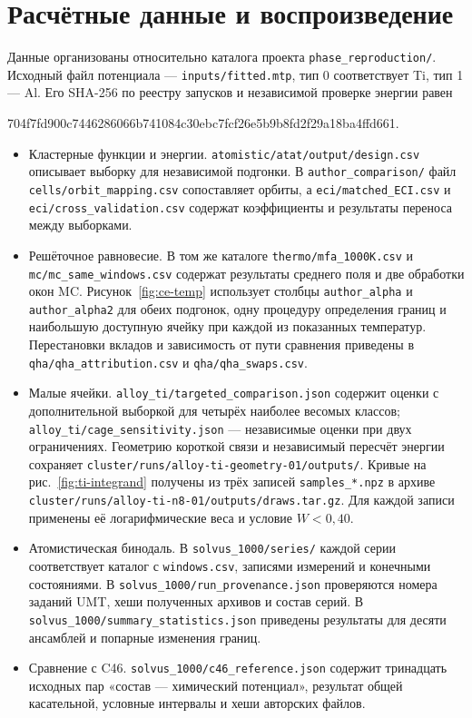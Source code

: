 \documentclass[11pt,a4paper]{article}
\begin{document}
\section*{Расчётные данные и воспроизведение}
\label{sec:archive}
Данные организованы относительно каталога проекта
\nolinkurl{phase_reproduction/}. Исходный файл потенциала —
\nolinkurl{inputs/fitted.mtp}, тип 0 соответствует Ti, тип 1 — Al.
Его SHA-256 по реестру запусков и независимой проверке энергии равен
\begin{center}
{\small\ttfamily 704f7fd900c7446286066b741084c30ebc7fcf26e5b9b8fd2f29a18ba4ffd661}.
\end{center}
\begin{itemize}
\item Кластерные функции и энергии. \nolinkurl{atomistic/atat/output/design.csv}
описывает выборку для независимой подгонки. В \nolinkurl{author_comparison/}
файл \nolinkurl{cells/orbit_mapping.csv} сопоставляет орбиты, а
\nolinkurl{eci/matched_ECI.csv} и \nolinkurl{eci/cross_validation.csv}
содержат коэффициенты и результаты переноса между выборками.
\item Решёточное равновесие. В том же каталоге
\nolinkurl{thermo/mfa_1000K.csv} и \nolinkurl{mc/mc_same_windows.csv}
содержат результаты среднего поля и две обработки окон MC.
Рисунок~\ref{fig:ce-temp} использует столбцы
\texttt{author\_alpha} и \texttt{author\_alpha2} для обеих подгонок,
одну процедуру определения границ и наибольшую доступную ячейку
при каждой из показанных температур. Перестановки вкладов и зависимость
от пути сравнения приведены в \nolinkurl{qha/qha_attribution.csv}
и \nolinkurl{qha/qha_swaps.csv}.
\item Малые ячейки. \nolinkurl{alloy_ti/targeted_comparison.json} содержит
оценки с дополнительной выборкой для четырёх наиболее весомых классов;
\nolinkurl{alloy_ti/cage_sensitivity.json} — независимые оценки при двух
ограничениях. Геометрию короткой связи и независимый пересчёт энергии
сохраняет \nolinkurl{cluster/runs/alloy-ti-geometry-01/outputs/}.
Кривые на рис.~\ref{fig:ti-integrand} получены из трёх записей
\texttt{samples\_*.npz} в архиве
\nolinkurl{cluster/runs/alloy-ti-n8-01/outputs/draws.tar.gz}.
Для каждой записи применены её логарифмические веса и условие \(W<0{,}40\).
\item Атомистическая бинодаль. В \nolinkurl{solvus_1000/series/} каждой
серии соответствует каталог с \texttt{windows.csv}, записями измерений и
конечными состояниями. В \nolinkurl{solvus_1000/run_provenance.json}
проверяются номера заданий UMT, хеши полученных архивов и состав серий.
В \nolinkurl{solvus_1000/summary_statistics.json} приведены результаты
для десяти ансамблей и попарные изменения границ.
\item Сравнение с C46. \nolinkurl{solvus_1000/c46_reference.json}
содержит тринадцать исходных пар «состав — химический потенциал»,
результат общей касательной, условные интервалы и хеши авторских файлов.
\end{itemize}
\end{document}
